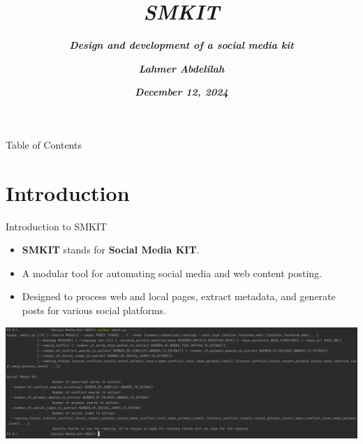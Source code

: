 \documentclass{beamer}
\title{ \textbf{ \textit{SMKIT} } }
\subtitle{ \textbf{ \textit{Design and development of a social media kit} } }
\author[ \textbf{ \textit{Abdelilah Lahmer} } ]{ \textbf{ \textit{Lahmer Abdelilah} } }
\date{ \textbf{ \textit{December 12, 2024} } }
\begin{document}
\frame{\titlepage}

\begin{frame}{Table of Contents}
    \tableofcontents    
\end{frame}


\section{Introduction}
    \begin{frame}{Introduction to SMKIT}
        \vspace{0.5cm}
        \begin{itemize}
            \item \textbf{SMKIT} stands for \textbf{Social Media KIT}.
            \item A modular tool for automating social media and web content posting.
            \item Designed to process web and local pages, extract metadata, and generate posts for various social platforms.
        \end{itemize}

        \begin{center}
            \includegraphics[width=\textwidth, keepaspectratio]{images/introduction_introduction_to_smkit_slide_image.png}
        \end{center}
    \end{frame}
\end{document}
